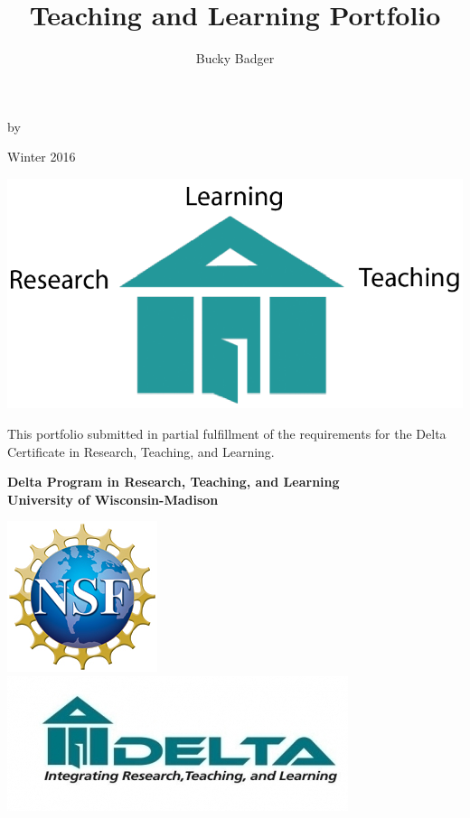 \documentclass[12pt]{report} %
\title{Teaching and Learning Portfolio}
\author{Bucky Badger}
\begin{document}
\begin{titlepage}
\begin{center}
\vspace*{0cm}
{\Large \textbf{\@title} \par}
\vspace{0.6cm}
{\Large by \par}
\vspace{0.6cm}
{\Large \textbf{\@author} \par}
\vspace{0.6cm}
{\Large Winter 2016 \par}
\vspace{1.0cm}
\includegraphics[scale=0.5]{images/house.png} \par
\vspace{1.0cm}
{This portfolio submitted in partial fulfillment of the requirements for the Delta Certificate in Research, Teaching, and Learning.\par}
\vspace{0.75cm}
{\textbf{ Delta Program in Research, Teaching, and Learning \\ University of Wisconsin-Madison }\par}
\vspace{0.75cm}
\includegraphics[scale=0.5]{images/nsf.jpg}
\includegraphics[scale=0.5]{images/delta.jpg}\ \ 

\end{center}
\end{titlepage}
\end{document}
